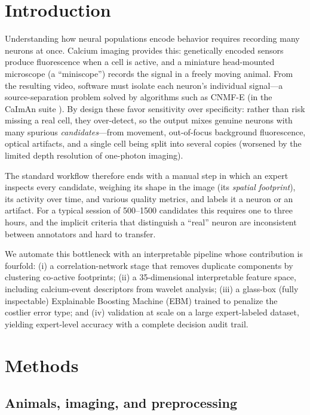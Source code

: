 \documentclass[conference]{IEEEtran}
\begin{document}
\section{Introduction}

Understanding how neural populations encode behavior requires recording many neurons at once. Calcium imaging provides this: genetically encoded sensors produce fluorescence when a cell is active, and a miniature head-mounted microscope (a ``miniscope'') records the signal in a freely moving animal. From the resulting video, software must isolate each neuron's individual signal---a source-separation problem solved by algorithms such as CNMF-E \cite{Zhou2018} (in the CaImAn suite \cite{Giovannucci2019}). By design these favor sensitivity over specificity: rather than risk missing a real cell, they over-detect, so the output mixes genuine neurons with many spurious \emph{candidates}---from movement, out-of-focus background fluorescence, optical artifacts, and a single cell being split into several copies (worsened by the limited depth resolution of one-photon imaging).

The standard workflow therefore ends with a manual step in which an expert inspects every candidate, weighing its shape in the image (its \emph{spatial footprint}), its activity over time, and various quality metrics, and labels it a neuron or an artifact. For a typical session of 500--1500 candidates this requires one to three hours, and the implicit criteria that distinguish a ``real'' neuron are inconsistent between annotators and hard to transfer.

We automate this bottleneck with an interpretable pipeline whose contribution is fourfold: (i) a correlation-network stage that removes duplicate components by clustering co-active footprints; (ii) a 35-dimensional interpretable feature space, including calcium-event descriptors from wavelet analysis; (iii) a glass-box (fully inspectable) Explainable Boosting Machine (EBM) trained to penalize the costlier error type; and (iv) validation at scale on a large expert-labeled dataset, yielding expert-level accuracy with a complete decision audit trail.

\section{Methods}

\subsection{Animals, imaging, and preprocessing}
\end{document}
